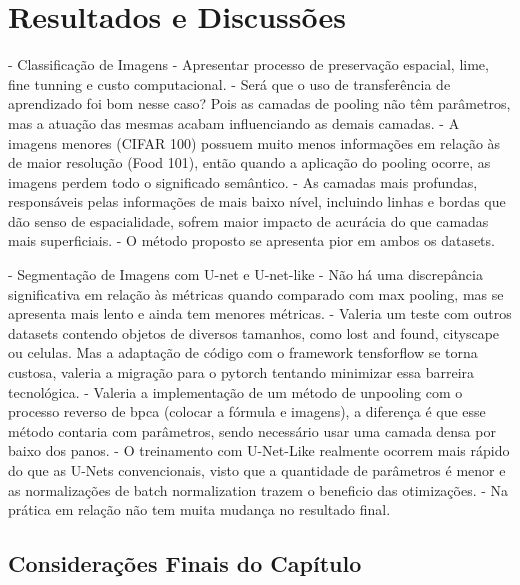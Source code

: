 \newpage
\clearpage

\section{Resultados e Discussões}
\label{result:result}

- Classificação de Imagens
        - Apresentar processo de preservação espacial, lime, fine tunning e custo computacional.
        - Será que o uso de transferência de aprendizado foi bom nesse caso? Pois as camadas de pooling não têm parâmetros, mas a atuação das mesmas acabam influenciando as demais camadas.
        - A imagens menores (CIFAR 100) possuem muito menos informações em relação às de maior resolução (Food 101), então quando a aplicação do pooling ocorre, as imagens perdem todo o significado semântico.
        - As camadas mais profundas, responsáveis pelas informações de mais baixo nível, incluindo linhas e bordas que dão senso de espacialidade, sofrem maior impacto de acurácia do que camadas mais superficiais.
        - O método proposto se apresenta pior em ambos os datasets.

- Segmentação de Imagens com U-net e U-net-like
        - Não há uma discrepância significativa em relação às métricas quando comparado com max pooling, mas se apresenta mais lento e ainda tem menores métricas.
        - Valeria um teste com outros datasets contendo objetos de diversos tamanhos, como lost and found, cityscape ou celulas. Mas a adaptação de código com o framework tensforflow se torna custosa, valeria a migração para o pytorch tentando minimizar essa barreira tecnológica.
        - Valeria a implementação de um método de unpooling com o processo reverso de bpca (colocar a fórmula e imagens), a diferença é que esse método contaria com parâmetros, sendo necessário usar uma camada densa por baixo dos panos.
        - O treinamento com U-Net-Like realmente ocorrem mais rápido do que as U-Nets convencionais, visto que a quantidade de parâmetros é menor e as normalizações de batch normalization trazem o beneficio das otimizações.
        - Na prática em relação não tem muita mudança no resultado final.

\subsection{Considerações Finais do Capítulo}
\label{result:final}

